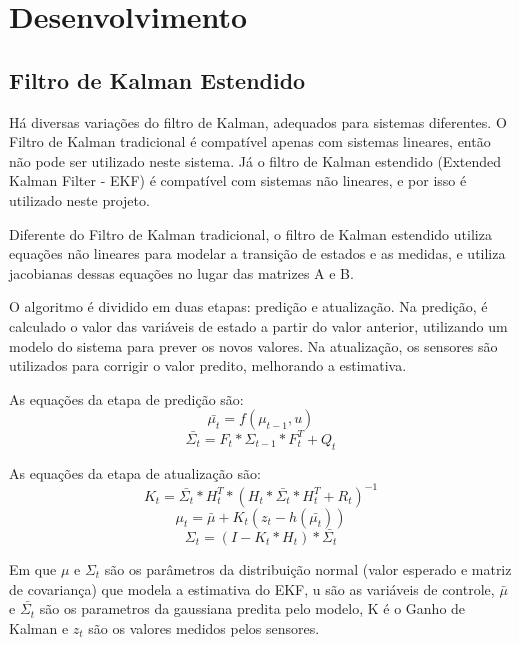\documentclass[
	12pt,				%
	openright,			%
	twoside,			%
	convert,
	a4paper,			%
	english,			%
	french,				%
	spanish,			%
	brazil				%
	]{abntex2}
\begin{document}
\chapter{Desenvolvimento}
\section{Filtro de Kalman Estendido}
Há diversas variações do filtro de Kalman, adequados para sistemas diferentes. O Filtro de Kalman tradicional é compatível apenas com sistemas lineares, então não pode ser utilizado neste sistema. Já o filtro de Kalman estendido (Extended Kalman Filter - EKF) é compatível com sistemas não lineares, e por isso é utilizado neste projeto.
\par
Diferente do Filtro de Kalman tradicional, o filtro de Kalman estendido utiliza equações não lineares para modelar a transição de estados e as medidas, e utiliza jacobianas dessas equações no lugar das matrizes A e B.
\par
O algoritmo é dividido em duas etapas: predição e atualização. Na predição, é calculado o valor das variáveis de estado a partir do valor anterior, utilizando um modelo do sistema para prever os novos valores. Na atualização, os sensores são utilizados para corrigir o valor predito, melhorando a estimativa.
\par
As equações da etapa de predição são:
\begin{equation}
	\bar{\mu_t} = f(\mu _{t-1}, u)
\end{equation}
\begin{equation}
	\bar{\Sigma_t}  = F_t * \Sigma_{t-1} * F_t^T + Q_t
\end{equation}
\par
As equações da etapa de atualização são:
\begin{equation}
	K_t = \bar{\Sigma_t} * H_t^T * (H_t * \bar{\Sigma_t} * H_t^T + R_t)^{-1}
\end{equation}
\begin{equation}
	\mu _t = \bar{\mu} + K_t (z_t - h(\bar{\mu_t}))
\end{equation}
\begin{equation}
	\Sigma _t = (I - K_t * H_t) * \bar{\Sigma_t}
\end{equation}

\par
Em que ${\mu}$ e $\Sigma_t$ são os parâmetros da distribuição normal (valor esperado e matriz de covariança) que modela a estimativa do EKF, u são as variáveis de controle, $\bar{\mu}$ e $\bar{\Sigma_t}$ são os parametros da gaussiana predita pelo modelo, K é o Ganho de Kalman e $z_t$ são os valores medidos pelos sensores.
\end{document}
